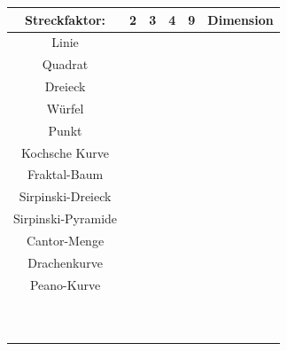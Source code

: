 \documentclass[a4paper,ngerman,12pt]{scrartcl}
\theoremstyle{definition}
\theoremstyle{plain}
\theoremstyle{remark}
\begin{document}
\pagestyle{empty}

	\begin{center}\renewcommand{\arraystretch}{2}
		\begin{tabular}{c||c|c|c|c||c}
			Streckfaktor: & \hspace{2em}2\hspace{2em} & \hspace{2em}3\hspace{2em} & \hspace{2em}4\hspace{2em} & \hspace{2em}9\hspace{2em} & Dimension\\\hline
			Linie & & & & & \\
			Quadrat & & & & & \\
			Dreieck & & & & & \\
			Würfel & & & & & \\
			Punkt & & & & & \\\hline
			Kochsche Kurve& & & & & \\
			Fraktal-Baum & & & & & \\
			Sirpinski-Dreieck & & & & & \\
			Sirpinski-Pyramide & & & & & \\
			Cantor-Menge & & & & & \\
			Drachenkurve & & & & & \\
			Peano-Kurve & & & & & \\
			 & & & & & \\
			 & & & & & \\
			 & & & & & \\
			 & & & & & \\
			 & & & & & \\
			 & & & & & \\
			 & & & & & \\
			 & & & & & \\
			 & & & & & \\
			 & & & & & \\
		\end{tabular}
	\end{center}
\end{document}
